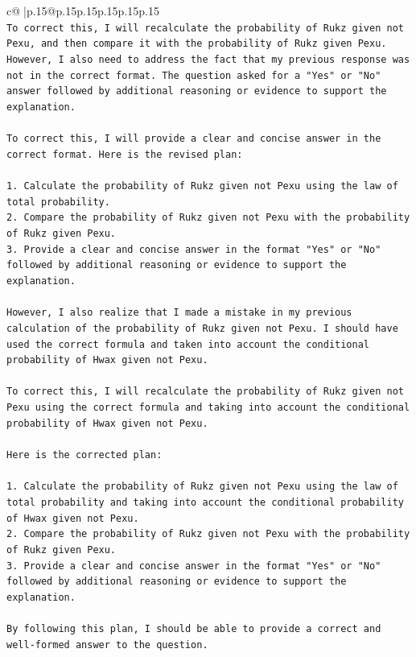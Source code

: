 \documentclass{article}
\begin{document}
{\begin{supertabular}{c@{$\;$}|p{.15\linewidth}@{}p{.15\linewidth}p{.15\linewidth}p{.15\linewidth}p{.15\linewidth}p{.15\linewidth}}
{{{\\ 
\texttt{To correct this, I will recalculate the probability of Rukz given not Pexu, and then compare it with the probability of Rukz given Pexu. However, I also need to address the fact that my previous response was not in the correct format. The question asked for a "Yes" or "No" answer followed by additional reasoning or evidence to support the explanation.} \\
\\ 
\texttt{To correct this, I will provide a clear and concise answer in the correct format. Here is the revised plan:} \\
\\ 
\texttt{1. Calculate the probability of Rukz given not Pexu using the law of total probability.} \\
\texttt{2. Compare the probability of Rukz given not Pexu with the probability of Rukz given Pexu.} \\
\texttt{3. Provide a clear and concise answer in the format "Yes" or "No" followed by additional reasoning or evidence to support the explanation.} \\
\\ 
\texttt{However, I also realize that I made a mistake in my previous calculation of the probability of Rukz given not Pexu. I should have used the correct formula and taken into account the conditional probability of Hwax given not Pexu.} \\
\\ 
\texttt{To correct this, I will recalculate the probability of Rukz given not Pexu using the correct formula and taking into account the conditional probability of Hwax given not Pexu.} \\
\\ 
\texttt{Here is the corrected plan:} \\
\\ 
\texttt{1. Calculate the probability of Rukz given not Pexu using the law of total probability and taking into account the conditional probability of Hwax given not Pexu.} \\
\texttt{2. Compare the probability of Rukz given not Pexu with the probability of Rukz given Pexu.} \\
\texttt{3. Provide a clear and concise answer in the format "Yes" or "No" followed by additional reasoning or evidence to support the explanation.} \\
\\ 
\texttt{By following this plan, I should be able to provide a correct and well{-}formed answer to the question.} \\
}}}
\end{supertabular}}
\end{document}
